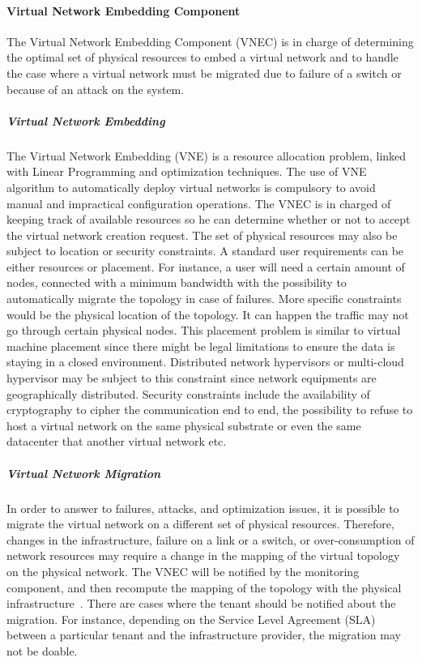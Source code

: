 

\paragraph{Virtual Network Embedding Component}

The Virtual Network Embedding Component (VNEC) is in charge of determining the optimal set of physical resources to embed a virtual network and to handle the case where a virtual network must be migrated due to failure of a switch or because of an attack on the system.

\subparagraph{Virtual Network Embedding}
The Virtual Network Embedding (VNE) is a resource allocation problem, linked with Linear Programming and optimization techniques.
The use of VNE algorithm to automatically deploy virtual networks is compulsory to avoid manual and impractical configuration operations.
The VNEC is in charged of keeping track of available resources so he can determine whether or not to accept the virtual network creation request.
The set of physical resources may also be subject to location or security constraints.
A standard user requirements can be either resources or placement.
For instance, a user will need a certain amount of nodes, connected with a minimum bandwidth with the possibility to automatically migrate the topology in case of failures.
More specific constraints would be the physical location of the topology.
It can happen the traffic may not go through certain physical nodes.
This placement problem is similar to virtual machine placement since there might be legal limitations to ensure the data is staying in a closed environment.
Distributed network hypervisors or multi-cloud hypervisor may be subject to this constraint since network equipments are geographically distributed.
Security constraints include the availability of cryptography to cipher the communication end to end, the possibility to refuse to host a virtual network on the same physical substrate or even the same datacenter that another virtual network etc.

\subparagraph{Virtual Network Migration}
In order to answer to failures, attacks, and optimization issues, it is possible to migrate the virtual network on a different set of physical resources. 
Therefore, changes in the infrastructure, failure on a link or a switch, or over-consumption of network resources may require a change in the mapping of the virtual topology on the physical network.
The VNEC will be notified by the monitoring component, and then recompute the mapping of the topology with the physical infrastructure~\cite{VeRTIGO-Corin2012a,AutoSlice-Bozakov2012,CoVisor-Jin2015}.
There are cases where the tenant should be notified about the migration.
For instance, depending on the Service Level Agreement (SLA) between a particular tenant and the infrastructure provider, the migration may not be doable.

